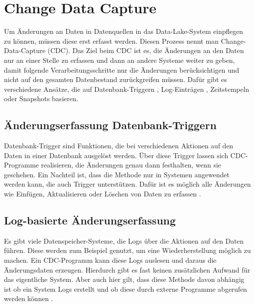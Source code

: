 \section{Change Data Capture}
\label{sec:cdc}

Um Änderungen an Daten in Datenquellen in das Data-Lake-System einpflegen zu können, müssen diese erst erfasst werden.
Diesen Prozess nennt man Change-Data-Capture (CDC).
Das Ziel beim CDC ist es, die Änderungen an den Daten nur an einer Stelle zu erfassen und dann an andere Systeme weiter zu geben, damit folgende Verarbeitungsschritte nur die Änderungen berücksichtigen und nicht auf den gesamten Datenbestand zurückgreifen müssen.
Dafür gibt es verschiedene Ansätze, die auf Datenbank-Triggern \parencite{boeing}, Log-Einträgen \parencite{delta-view_gen}, Zeitstempeln \parencite{delta-view_gen, boeing} oder Snapshots \parencite{cdc_in_nosql} basieren.

\subsection{Änderungserfassung Datenbank-Triggern}
Datenbank-Trigger sind Funktionen, die bei verschiedenen Aktionen auf den Daten in einer Datenbank ausgelöst werden.
Über diese Trigger lassen sich CDC-Programme realisieren, die Änderungen genau dann festhalten, wenn sie geschehen.
Ein Nachteil ist, dass die Methode nur in Systemen angewendet werden kann, die auch Trigger unterstützen.
Dafür ist es möglich alle Änderungen wie Einfügen, Aktualisieren oder Löschen von Daten zu erfassen \parencite{boeing}.

\subsection{Log-basierte Änderungserfassung}
Es gibt viele Datenspeicher-Systeme, die Logs über die Aktionen auf den Daten führen.
Diese werden zum Beispiel genutzt, um eine Wiederherstellung möglich zu machen.
Ein CDC-Programm kann diese Logs auslesen und daraus die Änderungsdaten erzeugen.
Hierdurch gibt es fast keinen zusätzlichen Aufwand für das eigentliche System.
Aber auch hier gilt, dass diese Methode davon abhängig ist ob ein System Logs erstellt und ob diese durch externe Programme abgerufen werden können \parencite{delta-view_gen}.


